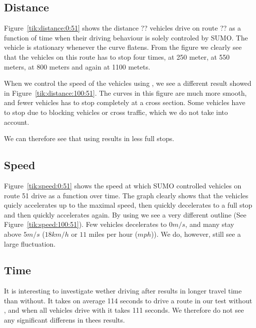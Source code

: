 \subsection{Distance}
Figure~\ref{tik:distance:0:51} shows the distance ?? vehicles drive on route ?? as a function of time when their driving behaviour is solely controled by SUMO. 
The vehicle is stationary whenever the curve flatens.
From the figure we clearly see that the vehicles on this route has to stop four times, at 250 meter, at 550 meters, at 800 meters and again at 1100 metets.

When we control the speed of the vehicles using \tech, we see a different result showed in Figure~\ref{tik:distance:100:51}.
The curves in this figure are much more smooth, and fewer vehicles has to stop completely at a cross section.
Some vehicles have to stop due to blocking vehicles or cross traffic, which we do not take into account.

We can therefore see that using \tech results in less full stops.
%
%

\subsection{Speed}
Figure~\ref{tik:speed:0:51} shows the speed at which SUMO controlled vehicles on route 51 drive as a function over time.
The graph clearly shows that the vehicles quicly accelerates up to the maximal speed, then quickly decelerates to a full stop and then quickly accelerates again.
By using \tech we see a very different outline (See Figure~\ref{tik:speed:100:51}).
Few vehicles decelerates to $0 m/s$, and many stay above $5 m/s$ ($18 km/h$ or $11$ miles per hour ($mph$)).
We do, however, still see a large fluctuation.
%
%

\subsection{Time}
It is interesting to investigate wether driving after \tech results in longer travel time than without.
It takes on average 114 seconds to drive a route in our test without \tech, and when all vehicles drive with \tech it takes 111 seconds. 
We therefore do not see any significant differens in thees results.


